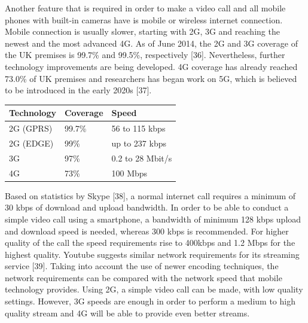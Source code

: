\documentclass{article}
\begin{document}
    	Another feature that is required in order to make a video call and all mobile phones with built-in cameras have is mobile or wireless internet connection. Mobile connection is usually slower, starting with 2G, 3G and reaching the newest and the most advanced 4G. As of June 2014, the 2G and 3G coverage of the UK premises is 99.7\% and 99.5\%, respectively [36]. Nevertheless, further technology improvements are being developed. 4G coverage has already reached 73.0\% of UK premises and researchers has began work on 5G, which is believed to be introduced in the early 2020s [37].\\
\begin{table}[h]
\centering
\begin{tabular}{|l|l|l|}
\hline
\textbf{Technology} & \textbf{Coverage} & \textbf{Speed}   \\ \hline
2G (GPRS)           & 99.7\%            & 56 to 115 kbps   \\ \hline
2G (EDGE)           & 99\%              & up to 237 kbps   \\ \hline
3G                  & 97\%              & 0.2 to 28 Mbit/s \\ \hline
4G                  & 73\%              & 100 Mbps         \\ \hline
\end{tabular}
\end{table}
    	Based on statistics by Skype [38], a normal internet call requires a minimum of 30 kbps of download and upload bandwidth. In order to be able to conduct a simple video call using a smartphone, a bandwidth of minimum 128 kbps upload and download speed is needed, whereas 300 kbps is recommended. For higher quality of the call the speed requirements rise to 400kbps and 1.2 Mbps for the highest quality. Youtube suggests similar network requirements for its streaming service [39]. Taking into account the use of newer encoding techniques, the network requirements can be compared with the network speed that mobile technology provides. Using 2G, a simple video call can be made, with low quality settings. However, 3G speeds are enough in order to perform a medium to high quality stream and 4G will be able to provide even better streams.\\
    	
\end{document}
